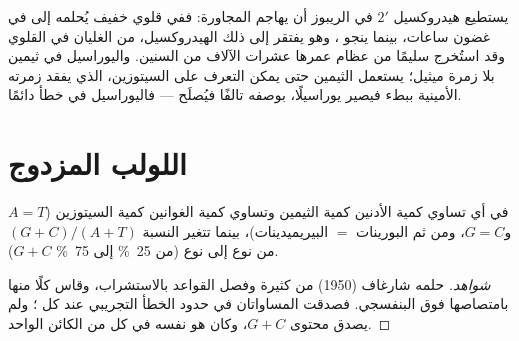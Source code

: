 \begin{example}\label{ex:b1:nucleic-acids:fragile}
يستطيع هيدروكسيل $2'$ في الريبوز أن يهاجم 
المجاورة: ففي قلوي خفيف يُحلمه  إلى  في غضون ساعات،
بينما ينجو ، وهو يفتقر إلى ذلك الهيدروكسيل، من الغليان في القلوي
وقد استُخرج سليمًا من عظام عمرها عشرات الآلاف من السنين. واليوراسيل في
 ثيمين بلا زمرة ميثيل؛  يستعمل الثيمين حتى يمكن التعرف على
السيتوزين، الذي يفقد زمرته الأمينية ببطء فيصير يوراسيلًا، بوصفه تالفًا
فيُصلَح --- فاليوراسيل في  خطأ دائمًا.
\end{example}

\section{اللولب المزدوج}

\begin{proposition}\label{prop:b1:nucleic-acids:chargaff}
في  أي  تساوي كمية الأدنين كمية الثيمين وتساوي كمية
الغوانين كمية السيتوزين ($A = T$ و$G = C$، ومن ثم البورينات $=$
البيريميدينات)، بينما تتغير النسبة $(G + C)/(A + T)$ من نوع إلى نوع
(من \qty{25}{\%} إلى \qty{75}{\%} $G + C$).
\end{proposition}
\begin{proof}[شواهد]
حلمه شارغاف (1950)  من  كثيرة وفصل القواعد بالاستشراب،
وقاس كلًا منها بامتصاصها فوق البنفسجي. فصدقت المساواتان في حدود الخطأ
التجريبي عند كل ؛ ولم يصدق محتوى $G + C$، وكان هو نفسه في كل 
من الكائن الواحد.
\end{proof}

